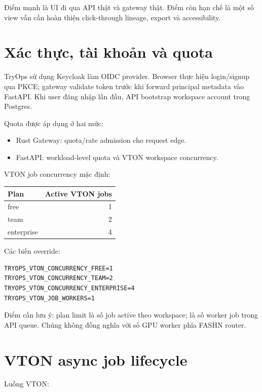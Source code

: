 \documentclass[12pt,a4paper,oneside]{report}
\newcommand{\code}[1]{\texttt{\detokenize{#1}}}
\begin{document}
Điểm mạnh là UI đi qua API thật và gateway thật. Điểm còn hạn chế là một số view vẫn cần hoàn thiện click-through lineage, export và accessibility.

\section{Xác thực, tài khoản và quota}

TryOps sử dụng Keycloak làm OIDC provider. Browser thực hiện login/signup qua PKCE; gateway validate token trước khi forward principal metadata vào FastAPI. Khi user đăng nhập lần đầu, API bootstrap workspace account trong Postgres.

Quota được áp dụng ở hai mức:

\begin{itemize}
  \item Rust Gateway: quota/rate admission cho request edge.
  \item FastAPI: workload-level quota và VTON workspace concurrency.
\end{itemize}

VTON job concurrency mặc định:

\begin{center}
\begin{tabular}{lr}
\toprule
\textbf{Plan} & \textbf{Active VTON jobs} \\
\midrule
free & 1 \\
team & 2 \\
enterprise & 4 \\
\bottomrule
\end{tabular}
\end{center}

Các biến override:

\begin{lstlisting}
TRYOPS_VTON_CONCURRENCY_FREE=1
TRYOPS_VTON_CONCURRENCY_TEAM=2
TRYOPS_VTON_CONCURRENCY_ENTERPRISE=4
TRYOPS_VTON_JOB_WORKERS=1
\end{lstlisting}

Điểm cần lưu ý: plan limit là số job active theo workspace; \code{TRYOPS_VTON_JOB_WORKERS} là số worker job trong API queue. Chúng không đồng nghĩa với số GPU worker phía FASHN router.

\section{VTON async job lifecycle}

Luồng VTON:
\end{document}
